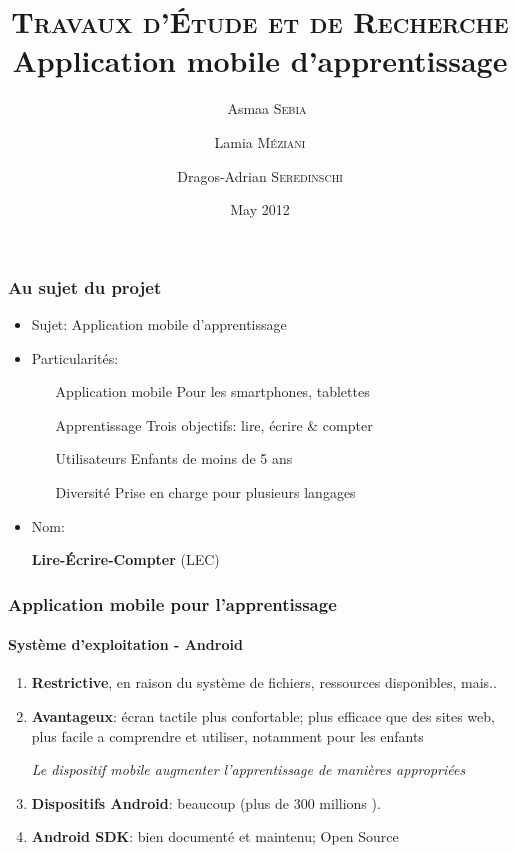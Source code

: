 \documentclass[15pt]{beamer}
\title[Application mobile d'apprentissage]{\textsc{Travaux d’\'Etude et de Recherche} \\Application mobile d'apprentissage}
\author{ \ \ Asmaa \textsc{Sebia}\\
\and Lamia \textsc{M\'eziani}\\
\and Dragos-Adrian \textsc{Seredinschi}}
\institute{Universit\'e d'Orl\'eans, Facult\'e des Sciences\\Département d'Informatique}
\date{May 2012}
\begin{document}
\begin{frame}
 \titlepage
\end{frame}


\begin{frame}
 \frametitle{Au sujet du projet}
\begin{itemize}
 \item Sujet: Application mobile d'apprentissage
 \item Particularit\'es:

  \begin{enumerate}
  \setlength{\itemindent}{6em}
  \item[Application mobile] Pour les smartphones, tablettes
  \item[Apprentissage] Trois objectifs: lire, \'ecrire \& compter
  \item[Utilisateurs] Enfants de moins de 5 ans
  \item[Diversit\'e] Prise en charge pour plusieurs langages
  \end{enumerate}

 \item Nom: 
\begin{center}
\textbf{Lire-\'Ecrire-Compter} (LEC)
\end{center}
\end{itemize}
\end{frame}

\begin{frame}
 \frametitle{Application mobile pour l'apprentissage}
 \framesubtitle{Syst\`eme d'exploitation - \textbf{Android}}
\begin{enumerate}
 \item<1-> \textbf{Restrictive}, en raison du syst\`eme de fichiers, ressources disponibles, mais..
 \item<2-> \textbf{Avantageux}: écran tactile plus confortable; plus efficace que des sites web,
  plus facile a comprendre et utiliser, notamment pour les enfants
  \begin{center}
  \textsl{Le dispositif mobile augmenter l'apprentissage de manières appropri\'ees} \cite{Marrer2009}
  \end{center}
  \item<3-> \textbf{Dispositifs Android}: beaucoup (plus de 300 millions \cite{AndyR2012}).
  \item<4-> \textbf{Android SDK}: bien document\'e et maintenu; Open Source
\end{enumerate}

\end{frame}
\end{document}
